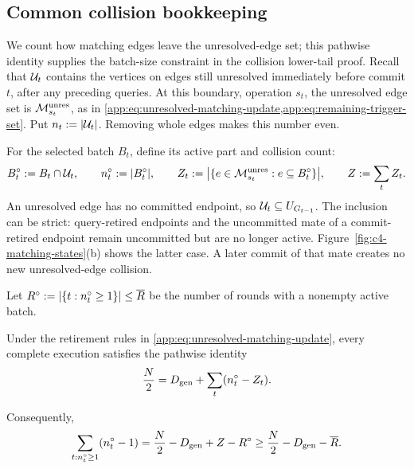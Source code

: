 \subsection{Common collision bookkeeping}
\label{app:lower-proof-collisions}

We count how matching edges leave the unresolved-edge set; this pathwise
identity supplies the batch-size constraint in the collision lower-tail
proof. Recall that \(\mathcal U_{t}\) contains the vertices on
edges still unresolved immediately before commit \(t\), after any preceding
queries. At this boundary, operation \(s_t\), the unresolved edge set is
\(\mathcal M_{s_t}^{\mathrm{unres}}\), as in
\cref{app:eq:unresolved-matching-update,app:eq:remaining-trigger-set}.
Put \(n_{t}:=|\mathcal U_{t}|\).
Removing whole edges makes this number even.

For the selected batch \(B_t\), define its active part and collision count:
\begin{equation}
 B_{t}^{\circ}:=B_t\cap\mathcal U_{t},
 \qquad
 n_{t}^{\circ}:=|B_{t}^{\circ}|,
 \qquad
 Z_{t}:=
 \bigl|\{e\in\mathcal M_{s_t}^{\mathrm{unres}}:
               e\subseteq B_{t}^{\circ}\}\bigr|,
 \qquad
 Z:=\sum_tZ_{t}.
 \label{app:eq:unresolved-batch-and-collisions}
\end{equation}
An unresolved edge has no committed endpoint, so
\(\mathcal U_{t}\subseteq U_{G_{t-1}}\).
The inclusion can be strict: query-retired endpoints and the uncommitted
mate of a commit-retired endpoint remain uncommitted but are no longer
active. Figure~\ref{fig:c4-matching-states}(b) shows the latter case.
A later commit of that mate creates no new unresolved-edge collision.

Let \(R^{\circ}:=|\{t:n_{t}^{\circ}\ge1\}|\le\overline R{}\)
be the number of rounds with a nonempty active batch.

\begin{lemma}
\label{app:lem:pathwise-edge-counting}
Under the retirement rules in \cref{app:eq:unresolved-matching-update},
every complete execution satisfies the pathwise identity
\begin{equation}
 \frac N2
 =D_{\mathrm{gen}}+
  \sum_t(n_{t}^{\circ}-Z_{t}).
 \label{app:eq:lower-edge-ledger}
\end{equation}

Consequently,
\begin{equation}
 \sum_{t:n_{t}^{\circ}\ge1}
   (n_{t}^{\circ}-1)
 =\frac N2-D_{\mathrm{gen}}+Z-R^{\circ}
 \ge\frac N2-D_{\mathrm{gen}}-\overline R{}.
 \label{app:eq:active-excess-ledger}
\end{equation}
\end{lemma}

